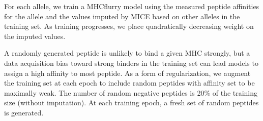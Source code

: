 For each allele, we train a MHCflurry model using the measured peptide affinities for the allele and the values imputed by MICE based on other alleles in the training set. As training progresses, we place quadratically decreasing weight on the imputed values.

A randomly generated peptide is unlikely to bind a given MHC strongly, but a data acquisition bias toward strong binders in the training set can lead models to assign a high affinity to most peptide. As a form of regularization, we augment the training set at each epoch to include random peptides with affinity set to be maximally weak. The number of random negative peptides is 20\% of the training size (without imputation). At each training epoch, a fresh set of random peptides is generated.
